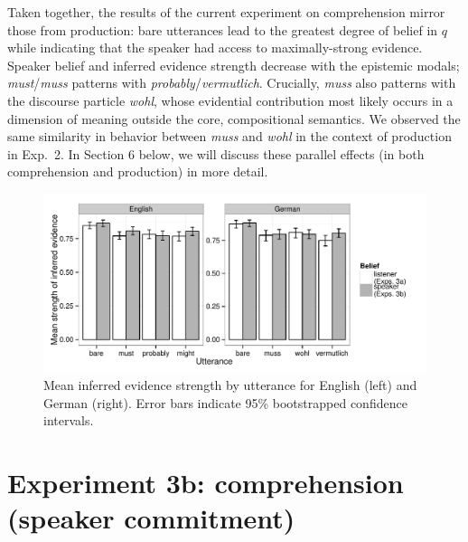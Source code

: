 \documentclass[11pt]{article}
\begin{document}
Taken together, the results of the current experiment on comprehension mirror those from production: bare utterances lead to the greatest degree of belief in $q$ while indicating that the speaker had access to maximally-strong evidence. Speaker belief and inferred evidence strength decrease with the epistemic modals; \emph{must}/\emph{muss} patterns with \emph{probably}/\emph{vermutlich}. Crucially, \emph{muss} also patterns with the discourse particle \emph{wohl}, whose evidential contribution most likely occurs in a dimension of meaning outside the core, compositional semantics. We observed the same similarity in behavior between \emph{muss} and \emph{wohl} in the context of production in Exp.~2. In Section 6 below, we will discuss these parallel effects (in both comprehension and production) in more detail.



\begin{figure}
	\centering
	\includegraphics[width=\textwidth]{pics/mean-evidence}
	\caption{Mean inferred evidence strength by utterance for English (left) and German (right). Error bars indicate 95\% bootstrapped confidence intervals.}
	\label{fig:exp3-evidence}
\end{figure}

\section{Experiment 3b: comprehension (speaker commitment)}
\end{document}
